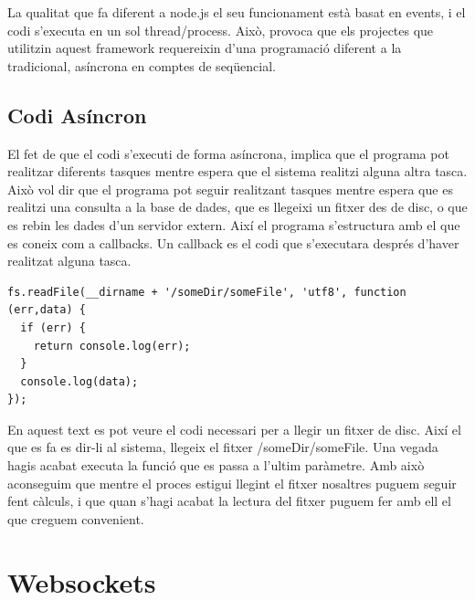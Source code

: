 La qualitat que fa diferent a node.js el seu funcionament està basat en events, i el codi s'executa en un sol thread/process. Això, provoca que els projectes que utilitzin aquest framework requereixin d'una programació diferent a la tradicional, asíncrona en comptes de seqüencial. 

\subsection{Codi Asíncron}

El fet de que el codi s'executi de forma asíncrona, implica que el programa pot realitzar diferents tasques mentre espera que el sistema realitzi alguna altra tasca. Això vol dir que el programa pot seguir realitzant tasques mentre espera que es realitzi una consulta a la base de dades, que es llegeixi un fitxer des de disc, o que es rebin les dades d'un servidor extern. Així el programa s'estructura amb el que es coneix com a callbacks. Un callback es el codi que s'executara després d'haver realitzat alguna tasca. 

\begin{verbatim}
fs.readFile(__dirname + '/someDir/someFile', 'utf8', function (err,data) {
  if (err) {
    return console.log(err);
  }
  console.log(data);
});
\end{verbatim}

En aquest text es pot veure el codi necessari per a llegir un fitxer de disc. Així el que es fa es dir-li al sistema, llegeix el fitxer /someDir/someFile. Una vegada hagis acabat executa la funció que es passa a l'ultim paràmetre. Amb això aconseguim que mentre el proces estigui llegint el fitxer nosaltres puguem seguir fent càlculs, i que quan s'hagi acabat la lectura del fitxer puguem fer amb ell el que creguem convenient. 



\section{Websockets}

